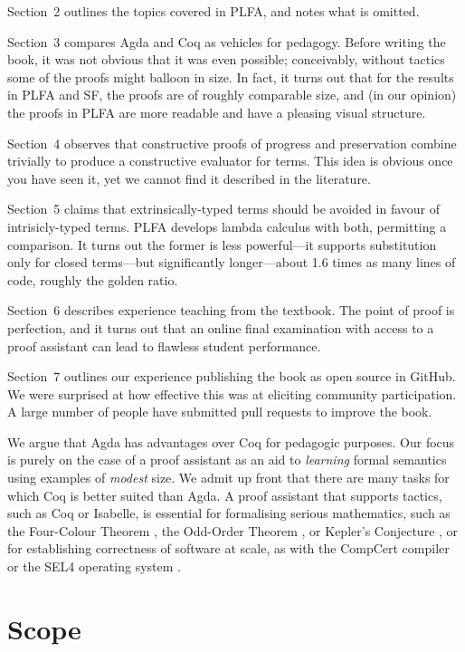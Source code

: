\documentclass[preprint,authoryear]{elsarticle}
\begin{document}
Section~2 outlines the
topics covered in PLFA, and notes what is omitted.  

Section~3 compares Agda and Coq as vehicles for pedagogy.  Before
writing the book, it was not obvious that it was even possible;
conceivably, without tactics some of the proofs might
balloon in size. In fact, it turns out that for the results in PLFA
and SF, the proofs are of roughly comparable size, and (in our opinion)
the proofs in PLFA are more readable and have a pleasing visual
structure.

Section~4 observes that constructive proofs of progress and
preservation combine trivially to produce a constructive evaluator for
terms.  This idea is obvious once you have seen it, yet we cannot
find it described in the literature.

Section~5 claims that extrinsically-typed terms should be avoided in favour of
intrisicly-typed terms.  PLFA develops lambda calculus with both,
permitting a comparison.  It turns out the
former is less powerful---it supports substitution only for closed
terms---but significantly longer---about 1.6 times as many lines of code,
roughly the golden ratio.

Section~6 describes experience teaching from the textbook.  The point
of proof is perfection, and it turns out that an online final
examination with access to a proof assistant can lead to flawless
student performance.

Section~7 outlines our experience publishing the book as open source
in GitHub.  We were surprised at how effective this was at eliciting
community participation.  A large number of people have submitted pull
requests to improve the book.

We argue that Agda has advantages over Coq for
pedagogic purposes.  Our focus is purely on the case of a proof assistant
as an aid to \emph{learning} formal semantics using examples of
\emph{modest} size.  We admit up front that
there are many tasks for which Coq is better suited than Agda.
A proof assistant that supports tactics, such as Coq or Isabelle,
is essential for formalising serious mathematics,
such as the Four-Colour Theorem \citep{Gonthier-2008},
the Odd-Order Theorem \citep{Gonthier-et-al-2013},
or Kepler's Conjecture \citep{Hales-et-al-2017},
or for establishing correctness of software at scale,
as with the CompCert compiler \citep{Leroy-2009,Kastner-et-al-2017}
or the SEL4 operating system \citep{Klein-2009,O'Connor-2016}.

\section{Scope}
\end{document}
